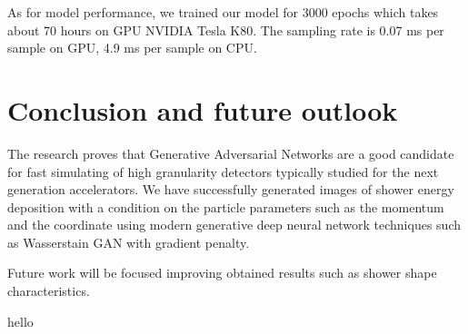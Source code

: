 \documentclass{webofc}
\begin{document}
As for model performance, we trained our model for 3000 epochs which takes about 70 hours on GPU NVIDIA Tesla K80. The sampling rate is 0.07 ms per sample on GPU, 4.9 ms per sample on CPU.

\section{Conclusion and future outlook}\label{conclusion}
The research proves that Generative Adversarial Networks are a good candidate for fast simulating of high granularity detectors typically studied for the next generation accelerators. We have successfully generated images of shower energy deposition with a condition on the particle parameters such as the momentum and the coordinate using modern generative deep neural network techniques such as Wasserstain GAN with gradient penalty.

Future work will be focused improving obtained results such as shower shape characteristics.




\appendix
hello
\end{document}

